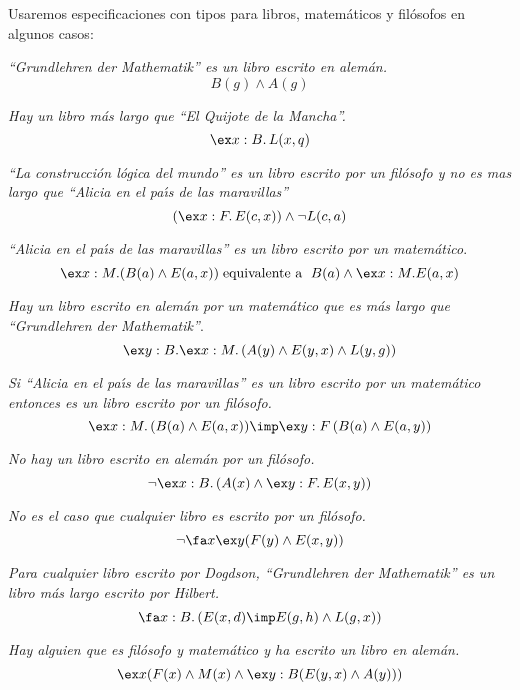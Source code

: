 \documentclass[11pt,letterpaper]{article}
\begin{document}
Usaremos especificaciones con tipos para libros, matemáticos y filósofos en 
algunos casos:
\bi
 \item \textit{\enquote{Grundlehren der Mathematik} es un libro escrito en
  alem\'an.}
  $$ B(g)\land A(g)$$
 \item \textit{Hay un libro m\'as largo que \enquote{El Quijote de la Mancha}.}
  $$ \ex x:B.\,L(x,q) $$
 \item \textit{\enquote{La construcci\'on l\'ogica del mundo} es un libro 
  escrito por un fil\'osofo y no es mas largo que 
  \enquote{Alicia en el pa\'{\i}s de las maravillas}}
  $$ (\ex x:F.\,E(c,x)) \land \neg L(c,a) $$
 \item \textit{\enquote{Alicia en el pa\'{\i}s de las maravillas} es un libro
  escrito por un matem\'atico}.
  \[
  \ex x:M.(B(a)\land E(a,x))\; \mbox{equivalente a }\;B(a)\land \ex x:M.E(a,x)
  \]
 \item \textit{Hay un libro escrito en alem\'an por un matem\'atico que es
  m\'as largo que \enquote{Grundlehren der Mathematik}}.
  $$ \ex y:B.\ex x:M.\,(A(y)\land E(y,x)\land L(y,g)) $$
 \item \textit{Si \enquote{Alicia en el pa\'{\i}s de las maravillas} es un libro
  escrito por un matemático entonces es un libro escrito por un fil\'osofo.}
  $$ \ex x:M.\,(B(a)\land E(a,x))\imp\ex y:F\,(B(a)\land E(a,y)) $$
 \item \textit{No hay un libro escrito en alem\'an por un fil\'osofo.}
  $$ \neg\ex x:B.\,(A(x)\land \ex y:F.\,E(x,y)) $$
 \item \textit{No es el caso que cualquier libro es escrito por un
  fil\'osofo.}
  $$ \neg\fa x\ex y (F(y)\land E(x,y)) $$
 \item \textit{Para cualquier libro escrito por Dogdson, 
  \enquote{Grundlehren der Mathematik} es un libro m\'as largo escrito por 
  Hilbert.}
  $$ \fa x:B.\, (E(x,d)\imp E(g,h)\land L(g,x)) $$
 \item \textit{Hay alguien que es fil\'osofo y matem\'atico y ha escrito un
  libro en alem\'an.}
  $$ \ex x(F(x)\land M(x)\land \ex y:B (E(y,x)\land A(y))) $$
\ei
\end{document}
